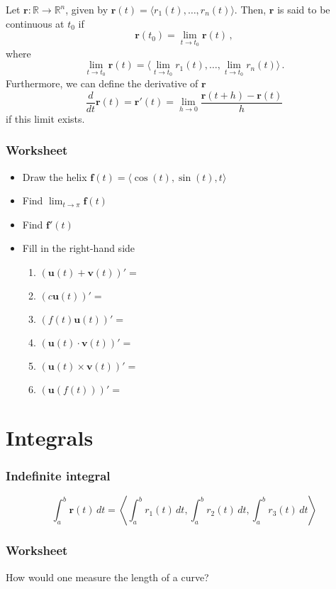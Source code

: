 \documentclass[aspectratio=169]{beamer}
\newcommand{\vect}{\mathbf}
\newcommand{\R}{\mathbb{R}}
\begin{document}
\begin{frame}
    \begin{theorem}
    Let $\vect{r}: \R \to \R^n$, given by $\vect{r}(t) = \langle r_1(t), \dots , r_n(t) \rangle$.
    Then, $\vect{r}$ is said to be continuous at $t_0$ if
    \begin{equation*}
        \vect{r}(t_0) = \lim_{t\to t_0} \vect{r}(t) \,,
    \end{equation*}
    where
    \begin{equation*}
        \lim_{t\to t_0} \vect{r}(t) = \langle \lim_{t\to t_0}r_1(t) , \dots , \lim_{t\to t_0} r_n(t) \rangle \,. 
    \end{equation*}
    Furthermore, we can define the derivative of $\vect{r}$
    \begin{equation*}
        \frac{d}{dt} \vect{r}(t) = \vect{r}'(t) = \lim_{h\to 0} \frac{\vect{r}(t+h) - \vect{r}(t)}{h} 
    \end{equation*}
    if this limit exists.
    \end{theorem}
\end{frame}
\begin{frame}
    \frametitle{Worksheet}
    \begin{itemize}
        \item Draw the helix $\vect{f}(t) = \langle \cos(t),\sin(t), t \rangle$
        \item Find $\lim_{t\to \pi} \vect{f}(t)$
        \item Find $\vect{f}'(t)$
        \item Fill in the right-hand side
            \begin{enumerate}
            \item  $(\vect{u}(t) + \vect{v}(t))' = $
            \item  $(c \vect{u}(t))' = $
            \item  $(f(t) \vect{u}(t))' = $
            \item  $(\vect{u}(t) \cdot \vect{v}(t))' = $
            \item  $(\vect{u}(t) \times \vect{v}(t))' = $
            \item  $(\vect{u}(f(t)))' = $
            \end{enumerate}
    \end{itemize}
\end{frame}

\section{Integrals}

\begin{frame}
    \frametitle{Indefinite integral}
\begin{equation*}
    \int_a^b \vect{r}(t) \, dt = \left\langle \int_a^b r_1(t) \, dt, \int_a^b r_2(t) \, dt, \int_a^b r_3(t) \, dt \right\rangle
\end{equation*}
\end{frame}

\begin{frame}
    \frametitle{Worksheet}
    How would one measure the length of a curve?
\end{frame}
\end{document}
